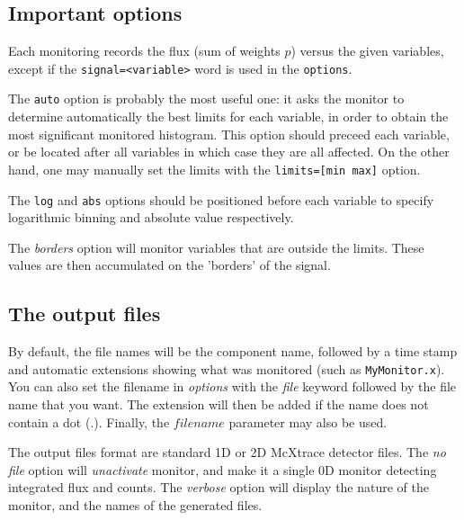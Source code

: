 \subsection{Important options}

Each monitoring records the flux (sum of weights $p$) versus the
given variables, except if the \verb+signal=<variable>+ word is used in the \verb+options+.

The \verb+auto+ option is probably the most useful one: it asks the monitor to
determine automatically the best limits for each variable, in order to obtain
the most significant monitored histogram. This option should preceed each
variable, or be located after all variables in which case they are all
affected.
On the other hand, one may manually set the limits with the \verb+limits=[min max]+ option.

The \verb+log+ and \verb+abs+ options should be positioned before each variable to specify logarithmic binning and absolute value respectively.

The \textit{borders} option will monitor variables that are outside
the limits. These values are then accumulated on the 'borders' of the
signal.

\subsection{The output files}

By default, the file names will be the component name, followed by a time stamp and
automatic extensions showing what was monitored (such as
\texttt{MyMonitor.x}). You can also set the filename in \textit{options}
with the \textit{file} keyword followed by the file name that you want. The
extension will then be added if the name does not contain a dot (.).
Finally, the $filename$ parameter may also be used.

The output files format are standard 1D or 2D McXtrace detector files.
The \textit{no file} option will \textit{unactivate} monitor, and make it a
single 0D monitor detecting integrated flux and counts.
The \textit{verbose} option will display the nature of the monitor, and the
names of the generated files.

